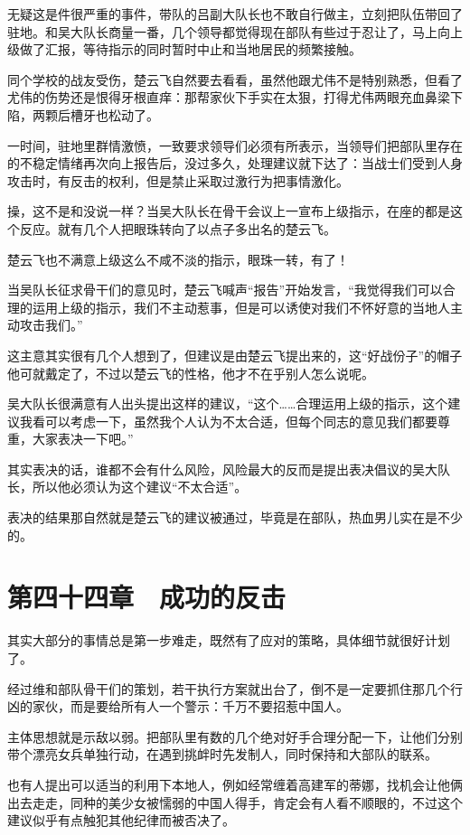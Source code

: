 无疑这是件很严重的事件，带队的吕副大队长也不敢自行做主，立刻把队伍带回了驻地。和吴大队长商量一番，几个领导都觉得现在部队有些过于忍让了，马上向上级做了汇报，等待指示的同时暂时中止和当地居民的频繁接触。

同个学校的战友受伤，楚云飞自然要去看看，虽然他跟尤伟不是特别熟悉，但看了尤伟的伤势还是恨得牙根直痒：那帮家伙下手实在太狠，打得尤伟两眼充血鼻梁下陷，两颗后槽牙也松动了。

一时间，驻地里群情激愤，一致要求领导们必须有所表示，当领导们把部队里存在的不稳定情绪再次向上报告后，没过多久，处理建议就下达了：当战士们受到人身攻击时，有反击的权利，但是禁止采取过激行为把事情激化。

操，这不是和没说一样？当吴大队长在骨干会议上一宣布上级指示，在座的都是这个反应。就有几个人把眼珠转向了以点子多出名的楚云飞。

楚云飞也不满意上级这么不咸不淡的指示，眼珠一转，有了！

当吴队长征求骨干们的意见时，楚云飞喊声“报告”开始发言，“我觉得我们可以合理的运用上级的指示，我们不主动惹事，但是可以诱使对我们不怀好意的当地人主动攻击我们。”

这主意其实很有几个人想到了，但建议是由楚云飞提出来的，这“好战份子”的帽子他可就戴定了，不过以楚云飞的性格，他才不在乎别人怎么说呢。

吴大队长很满意有人出头提出这样的建议，“这个……合理运用上级的指示，这个建议我看可以考虑一下，虽然我个人认为不太合适，但每个同志的意见我们都要尊重，大家表决一下吧。”

其实表决的话，谁都不会有什么风险，风险最大的反而是提出表决倡议的吴大队长，所以他必须认为这个建议“不太合适”。

表决的结果那自然就是楚云飞的建议被通过，毕竟是在部队，热血男儿实在是不少的。

\section{第四十四章　成功的反击}

其实大部分的事情总是第一步难走，既然有了应对的策略，具体细节就很好计划了。

经过维和部队骨干们的策划，若干执行方案就出台了，倒不是一定要抓住那几个行凶的家伙，而是要给所有人一个警示：千万不要招惹中国人。

主体思想就是示敌以弱。把部队里有数的几个绝对好手合理分配一下，让他们分别带个漂亮女兵单独行动，在遇到挑衅时先发制人，同时保持和大部队的联系。

也有人提出可以适当的利用下本地人，例如经常缠着高建军的蒂娜，找机会让他俩出去走走，同种的美少女被懦弱的中国人得手，肯定会有人看不顺眼的，不过这个建议似乎有点触犯其他纪律而被否决了。

